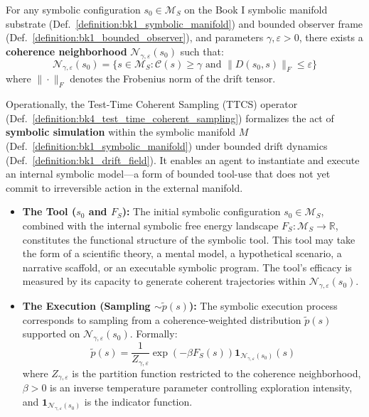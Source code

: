 \begin{axiom}
\label{axiom:bk4_bounded_accessibility}
For any symbolic configuration $s_0 \in \mathcal{M}_S$ on the Book I symbolic manifold substrate (Def.~\ref{definition:bk1_symbolic_manifold}) and bounded observer frame (Def.~\ref{definition:bk1_bounded_observer}), and parameters $\gamma, \varepsilon > 0$, there exists a \textbf{coherence neighborhood} $\mathcal{N}_{\gamma,\varepsilon}(s_0)$ such that:
\[
\mathcal{N}_{\gamma,\varepsilon}(s_0) = \{s \in \mathcal{M}_S : \mathcal{C}(s) \geq \gamma \text{ and } \|D(s_0, s)\|_F \leq \varepsilon\}
\]
where $\|\cdot\|_F$ denotes the Frobenius norm of the drift tensor.
\end{axiom}

\begin{scholium}
\label{scholium:bk4_ttcs_simulation_tool_use}
Operationally, the Test-Time Coherent Sampling (TTCS) operator (Def.~\ref{definition:bk4_test_time_coherent_sampling}) formalizes the act of \textbf{symbolic simulation} within the symbolic manifold $M$ (Def.~\ref{definition:bk1_symbolic_manifold}) under bounded drift dynamics (Def.~\ref{definition:bk1_drift_field}). It enables an agent to instantiate and execute an internal symbolic model---a form of bounded tool-use that does not yet commit to irreversible action in the external manifold.

\begin{itemize}
  \item \textbf{The Tool ($s_0$ and $F_S$):}  
  The initial symbolic configuration $s_0 \in \mathcal{M}_S$, combined with the internal symbolic free energy landscape $F_S: \mathcal{M}_S \to \mathbb{R}$, constitutes the functional structure of the symbolic tool. This tool may take the form of a scientific theory, a mental model, a hypothetical scenario, a narrative scaffold, or an executable symbolic program. The tool's efficacy is measured by its capacity to generate coherent trajectories within $\mathcal{N}_{\gamma,\varepsilon}(s_0)$.

  \item \textbf{The Execution (Sampling $\sim \tilde{p}(s)$):}  
  The symbolic execution process corresponds to sampling from a coherence-weighted distribution $\tilde{p}(s)$ supported on $\mathcal{N}_{\gamma,\varepsilon}(s_0)$. Formally:
  \[
  \tilde{p}(s) = \frac{1}{Z_{\gamma,\varepsilon}} \exp\left(-\beta F_S(s)\right) \mathbf{1}_{\mathcal{N}_{\gamma,\varepsilon}(s_0)}(s)
  \]
  where $Z_{\gamma,\varepsilon}$ is the partition function restricted to the coherence neighborhood, $\beta > 0$ is an inverse temperature parameter controlling exploration intensity, and $\mathbf{1}_{\mathcal{N}_{\gamma,\varepsilon}(s_0)}$ is the indicator function.


\end{itemize}
\end{scholium}
